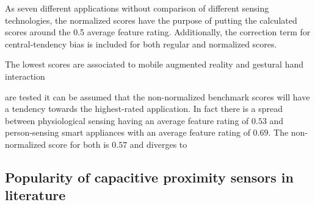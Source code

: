 As seven different applications without comparison of different sensing technologies, the normalized scores have the purpose of putting the calculated scores around the 0.5 average feature rating. Additionally, the correction term for central-tendency bias is included for both regular and normalized scores. 

The lowest scores are associated to mobile augmented reality and gestural hand interaction

are tested it can be assumed that the non-normalized benchmark scores will have a tendency towards the highest-rated application. In fact there is a spread between physiological sensing having an average feature rating of $0.53$ and person-sensing smart appliances with an average feature rating of $0.69$. The non-normalized score for both is $0.57$ and diverges to 



\subsection{Popularity of capacitive proximity sensors in literature}


